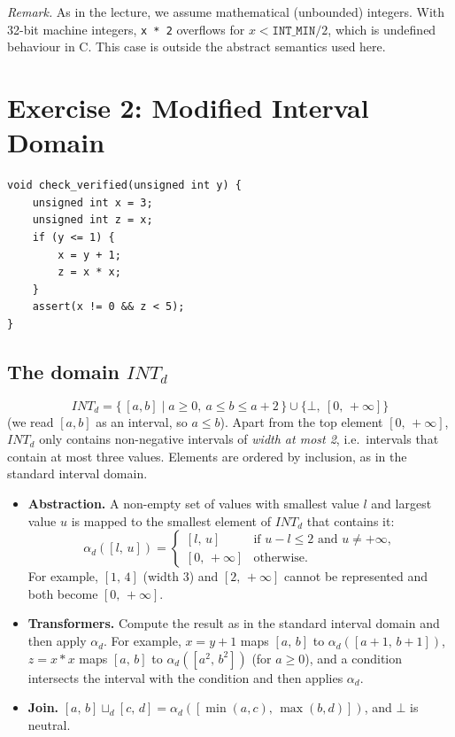 \documentclass[11pt,a4paper]{article}
\newcommand{\itv}[2]{[#1,\,#2]}
\newcommand{\pinf}{+\infty}
\newcommand{\INTd}{\mathit{INT}_d}
\begin{document}
\medskip
\noindent\textit{Remark.} As in the lecture, we assume mathematical (unbounded) integers.
With 32-bit machine integers, \texttt{x * 2} overflows for $x < \texttt{INT\_MIN}/2$,
which is undefined behaviour in C. This case is outside the abstract semantics used here.

\newpage
\section*{Exercise 2: Modified Interval Domain}

\begin{lstlisting}
void check_verified(unsigned int y) {
    unsigned int x = 3;
    unsigned int z = x;
    if (y <= 1) {
        x = y + 1;
        z = x * x;
    }
    assert(x != 0 && z < 5);
}
\end{lstlisting}

\subsection*{The domain $\INTd$}

\[
  \INTd = \{\, [a,b] \mid a \ge 0,\ a \le b \le a + 2 \,\} \cup \{\bot,\ \itv{0}{\pinf}\}
\]
(we read $[a,b]$ as an interval, so $a \le b$). Apart from the top element $\itv{0}{\pinf}$,
$\INTd$ only contains non-negative intervals of \emph{width at most 2}, i.e.\ intervals
that contain at most three values. Elements are ordered by inclusion, as in the standard
interval domain.

\begin{itemize}
  \item \textbf{Abstraction.} A non-empty set of values with smallest value $l$ and largest
        value $u$ is mapped to the smallest element of $\INTd$ that contains it:
        \[
          \alpha_d(\itv{l}{u}) =
          \begin{cases}
            \itv{l}{u}    & \text{if } u - l \le 2 \text{ and } u \neq \pinf,\\
            \itv{0}{\pinf} & \text{otherwise.}
          \end{cases}
        \]
        For example, $\itv{1}{4}$ (width 3) and $\itv{2}{\pinf}$ cannot be represented and
        both become $\itv{0}{\pinf}$.
  \item \textbf{Transformers.} Compute the result as in the standard interval domain and
        then apply $\alpha_d$. For example, $x = y + 1$ maps $\itv{a}{b}$ to
        $\alpha_d(\itv{a+1}{b+1})$, $z = x * x$ maps $\itv{a}{b}$ to $\alpha_d(\itv{a^2}{b^2})$
        (for $a \ge 0$), and a condition intersects the interval with the condition and then
        applies $\alpha_d$.
  \item \textbf{Join.} $\itv{a}{b} \sqcup_d \itv{c}{d} = \alpha_d(\itv{\min(a,c)}{\max(b,d)})$,
        and $\bot$ is neutral.
\end{itemize}
\end{document}
